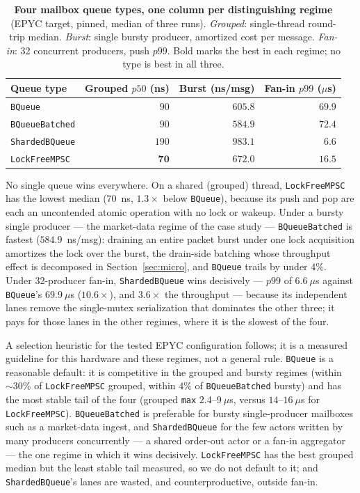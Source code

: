 \documentclass[11pt]{article}
\begin{document}
\begin{table}[!htb]
\centering
\caption{\textbf{Four mailbox queue types, one column per distinguishing regime}
(EPYC target, pinned, median of three runs). \emph{Grouped}: single-thread
round-trip median. \emph{Burst}: single bursty producer, amortized cost per
message. \emph{Fan-in}: 32 concurrent producers, push $p99$. Bold marks the best
in each regime; no type is best in all three.}
\label{tab:qtypes}
\small
\begin{tabular}{lrrr}
\toprule
Queue type & Grouped $p50$ (ns) & Burst (ns/msg) & Fan-in $p99$ ($\mu$s) \\
\midrule
\texttt{BQueue}        & $90$          & $605.8$          & $69.9$ \\
\texttt{BQueueBatched} & $90$          & $\mathbf{584.9}$ & $72.4$ \\
\texttt{ShardedBQueue} & $190$         & $983.1$          & $\mathbf{6.6}$ \\
\texttt{LockFreeMPSC}  & $\mathbf{70}$ & $672.0$          & $16.5$ \\
\bottomrule
\end{tabular}
\end{table}

No single queue wins everywhere. On a shared (grouped) thread, \texttt{LockFreeMPSC}
has the lowest median ($70$~ns, $1.3\times$ below \texttt{BQueue}), because its
push and pop are each an uncontended atomic operation with no lock or wakeup.
Under a bursty single producer --- the market-data regime of the case study ---
\texttt{BQueueBatched} is fastest ($584.9$~ns/msg): draining an entire packet
burst under one lock acquisition amortizes the lock over the burst, the
drain-side batching whose throughput effect is decomposed in
Section~\ref{sec:micro}, and
\texttt{BQueue} trails by under $4\%$. Under 32-producer fan-in, \texttt{ShardedBQueue}
wins decisively --- $p99$ of $6.6~\mu$s against \texttt{BQueue}'s $69.9~\mu$s
($10.6\times$), and $3.6\times$ the throughput --- because its independent lanes
remove the single-mutex serialization that dominates the other three; it pays for
those lanes in the other regimes, where it is the slowest of the four.

A selection heuristic for the tested EPYC configuration follows; it is a measured
guideline for this hardware and these regimes, not a general rule. \texttt{BQueue}
is a reasonable default: it is competitive in the grouped and bursty regimes
(within $\sim\!30\%$ of \texttt{LockFreeMPSC} grouped, within $4\%$ of
\texttt{BQueueBatched} bursty) and has the most stable tail of the four (grouped
\texttt{max} $2.4$--$9~\mu$s, versus $14$--$16~\mu$s for \texttt{LockFreeMPSC}).
\texttt{BQueueBatched} is preferable for bursty single-producer mailboxes such as
a market-data ingest, and \texttt{ShardedBQueue} for the few actors written by
many producers concurrently --- a shared order-out actor or a fan-in aggregator
--- the one regime in which it wins decisively. \texttt{LockFreeMPSC} has the best
grouped median but the least stable tail measured, so we do not default to it; and
\texttt{ShardedBQueue}'s lanes are wasted, and counterproductive, outside fan-in.
\end{document}
